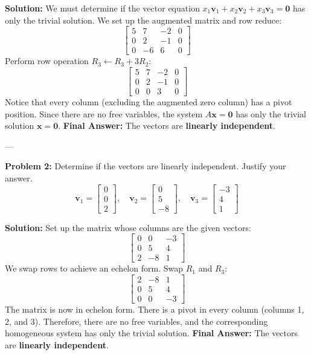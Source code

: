 \documentclass[11pt]{article}
\begin{document}
\textbf{Solution:}
We must determine if the vector equation $x_1\mathbf{v}_1 + x_2\mathbf{v}_2 + x_3\mathbf{v}_3 = \mathbf{0}$ has only the trivial solution. We set up the augmented matrix and row reduce:
\[
\begin{bmatrix}
5 & 7 & -2 & 0 \\
0 & 2 & -1 & 0 \\
0 & -6 & 6 & 0
\end{bmatrix}
\]
Perform row operation $R_3 \leftarrow R_3 + 3R_2$:
\[
\begin{bmatrix}
5 & 7 & -2 & 0 \\
0 & 2 & -1 & 0 \\
0 & 0 & 3 & 0
\end{bmatrix}
\]
Notice that every column (excluding the augmented zero column) has a pivot position. Since there are no free variables, the system $A\mathbf{x} = \mathbf{0}$ has only the trivial solution $\mathbf{x} = \mathbf{0}$.
\textbf{Final Answer:} The vectors are \textbf{linearly independent}.

---

\textbf{Problem 2:} Determine if the vectors are linearly independent. Justify your answer.
\[ \mathbf{v}_1 = \begin{bmatrix} 0 \\ 0 \\ 2 \end{bmatrix}, \quad \mathbf{v}_2 = \begin{bmatrix} 0 \\ 5 \\ -8 \end{bmatrix}, \quad \mathbf{v}_3 = \begin{bmatrix} -3 \\ 4 \\ 1 \end{bmatrix} \]

\textbf{Solution:}
Set up the matrix whose columns are the given vectors:
\[
\begin{bmatrix}
0 & 0 & -3 \\
0 & 5 & 4 \\
2 & -8 & 1 
\end{bmatrix}
\]
We swap rows to achieve an echelon form. 
Swap $R_1$ and $R_3$:
\[
\begin{bmatrix}
2 & -8 & 1 \\
0 & 5 & 4 \\
0 & 0 & -3
\end{bmatrix}
\]
The matrix is now in echelon form. There is a pivot in every column (columns 1, 2, and 3). Therefore, there are no free variables, and the corresponding homogeneous system has only the trivial solution.
\textbf{Final Answer:} The vectors are \textbf{linearly independent}.
\end{document}
